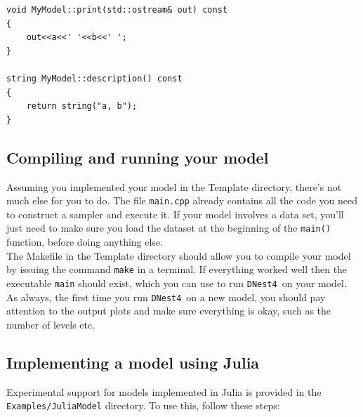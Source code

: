 \documentclass[a4paper, 11pt]{article}
\newcommand{\dnest}{{\tt DNest4}}
\begin{document}
\begin{framed}
\begin{verbatim}
void MyModel::print(std::ostream& out) const
{
    out<<a<<' '<<b<<' ';
}

string MyModel::description() const
{
    return string("a, b");
}
\end{verbatim}
\end{framed}

\subsection{Compiling and running your model}
Assuming you implemented your model in the Template directory, there's not
much else for you to do. The file {\tt main.cpp} already contains all the code
you need to construct a sampler and execute it. If your model involves a data
set, you'll just need to make sure you load the dataset at the beginning
of the {\tt main()} function, before doing anything else.\\

The Makefile in the Template directory should allow you to compile your model
by issuing the command {\tt make} in a terminal. If everything worked well
then the executable {\tt main} should exist, which you can use to run
\dnest~on your model. As always, the first time you run \dnest~on a new model,
you should pay attention to the output plots and make sure everything is okay,
such as the number of levels etc.


\subsection{Implementing a model using Julia}
Experimental support for models implemented in Julia is provided in the
{\tt Examples/JuliaModel} directory. To use this, follow these steps:
\end{document}
